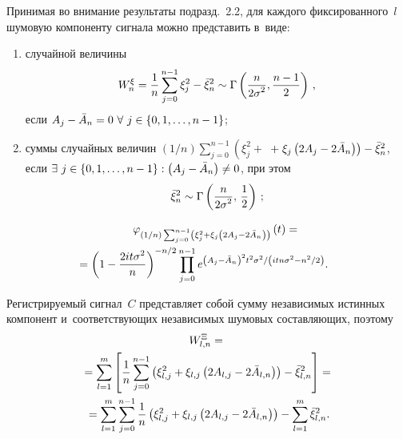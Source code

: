 \begin{multicols}{2}
    Принимая во внимание результаты подразд.~2.2, для каждого фиксированного~$l$ шумовую 
    компоненту сигнала можно представить в~виде:
   \begin{enumerate}[($i$)]
        \item случайной величины
        $$
        W_n^{\xi} = \displaystyle\frac{\displaystyle 1\mathstrut}{\displaystyle n\mathstrut} 
        \sum\limits_{j=0}^{n-1}\xi_{j}^{2} - \bar{\xi}_{n}^{2} 
        \sim \Gamma\left( \displaystyle\frac{\displaystyle n\mathstrut}{\displaystyle 2\sigma^{2}\mathstrut}, \displaystyle\frac{\displaystyle n-1\mathstrut}{\displaystyle 2\mathstrut}\right)\,, 
        $$
        если $ A_{j} \hm- \bar{A}_{n} \hm= 0 \ \forall \ j \hm\in 
        \left\lbrace  0, 1, \ldots, n-1\right\rbrace$;
        \item суммы случайных величин $({1}/{n}) \sum\nolimits_{j=0}^{n-1}
        \left( \xi_{j}^{2} +\right.$\linebreak
        $\left.+\;\xi_{j} \left( 2A_{j}-2\bar{A}_{n}\right)\right)  \hm- 
        \bar{\xi}_{n}^{2}$, если $\exists \ j \hm\in \left\lbrace 0, 1, \ldots, 
        n-1\right\rbrace : \left( A_{j} \hm- \bar{A}_{n}\right)\hm \neq 0$, при этом
        $$
        \bar{\xi}_{n}^{2}  \sim  \Gamma\left(\displaystyle\frac{\displaystyle n\mathstrut}{\displaystyle 2\sigma^{2}\mathstrut}, \,
\displaystyle\frac{\displaystyle 1\mathstrut}{\displaystyle 2\mathstrut}\right)\,;
        $$ 
        
        \vspace*{-12pt}
        
        \noindent
        \begin{multline*}
        \varphi_{({1}/{n}) \sum\nolimits_{j=0}^{n-1}\left( \xi_{j}^{2} + 
        \xi_{j} \left( 2A_{j}-2\bar{A}_{n}\right)\right) }\left( t\right)  
        ={}\\
        \hspace*{-30pt}{}= \left( 1-\fr{2it\sigma^2}{n}\right)^{-{n}/{2}}  
        \prod\limits_{j=0}^{n-1} 
        e^{{\left(A_{j}-\bar{A}_{n}\right)^{2}t^{2}\sigma^{2}}/\left({i  tn\sigma^{2} - 
        {n^{2}}/{2} }\right)}.\hspace*{-3.77995pt}
        \end{multline*}
            \end{enumerate}


Регистрируемый сигнал~$C$ представляет собой сумму независимых истинных компонент 
и~соответствующих независимых шумовых со\-став\-ля\-ющих, поэтому
\begin{multline*}
    W_{l,n}^{\Xi} = {}\\
    {}= \sum\limits_{l=1}^{m}\left[ \displaystyle\frac{\displaystyle 1\mathstrut}{\displaystyle n\mathstrut} 
    \sum\limits_{j=0}^{n-1}\left( \xi_{l,j}^{2} + \xi_{l,j} \left( 2A_{l,j}-
    2\bar{A}_{l,n}\right)\right)  - \bar{\xi}_{l,n}^{2}\right] ={}
\\
{}    = \sum\limits_{l=1}^{m}\sum\limits_{j=0}^{n-1}\frac{1}{n} \left( \xi_{l,j}^{2} + \xi_{l,j} \left( 2A_{l,j}-2\bar{A}_{l,n}\right)\right)  -  \sum\limits_{l=1}^{m}\bar{\xi}_{l,n}^{2}.
\end{multline*}
    

\end{multicols}

